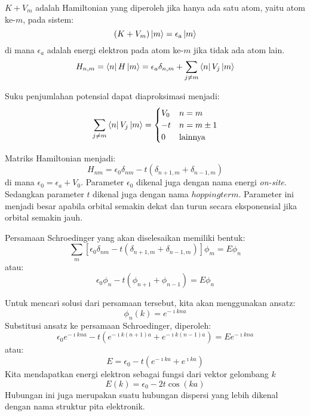 $K + V_{m}$ adalah Hamiltonian yang diperoleh jika hanya ada satu
atom, yaitu atom ke-$m$, pada sistem:
\begin{equation*}
(K + V_{m})\ket{m} = \epsilon_{\mathrm{a}}\ket{m}    
\end{equation*}
di mana $\epsilon_{a}$ adalah energi elektron pada atom ke-$m$
jika tidak ada atom lain.
\begin{equation*}
H_{n,m} = \bra{n}H\ket{m} = \epsilon_{a}\delta_{n,m} + \sum_{j \neq m} \bra{n}V_{j}\ket{m}
\end{equation*}

Suku penjumlahan potensial dapat diaproksimasi menjadi:
\begin{equation*}
\sum_{j \neq m} \bra{n}V_{j}\ket{m} = \begin{cases}
V_{0} & n = m \\
-t & n = m \pm 1 \\
0 & \text{lainnya}
\end{cases}
\end{equation*}

Matriks Hamiltonian menjadi:
\begin{equation*}
H_{nm} = \epsilon_{0}\delta_{nm} - t(\delta_{n+1,m} + \delta_{n-1,m})
\end{equation*}
di mana $\epsilon_{0} = \epsilon_{a} + V_{0}$.
Parameter $\epsilon_{0}$ dikenal juga dengan nama energi \textit{on-site}.
Sedangkan parameter $t$ dikenal juga dengan nama $hopping term$.
Parameter ini menjadi
besar apabila orbital semakin dekat dan turun secara eksponensial jika
orbital semakin jauh.

Persamaan Schroedinger yang akan diselesaikan memiliki bentuk:
\begin{equation*}
\sum_{m} \left[
  \epsilon_{0}\delta_{nm} - t(\delta_{n+1,m} + \delta_{n-1,m})
\right] \phi_{m} =
E \phi_{n}
\end{equation*}
atau:
\begin{equation*}
\epsilon_{0} \phi_{n} - t \left( \phi_{n+1} + \phi_{n-1} \right) =
E \phi_{n}
\end{equation*}

Untuk mencari solusi dari persamaan tersebut, kita akan menggunakan ansatz:
\begin{equation*}
\phi_{n}(k) = e^{-\imath k n a}
\end{equation*}
Substitusi ansatz ke persamaan Schroedinger, diperoleh:
\begin{equation*}
\epsilon_{0} e^{-\imath k n a} - t\left(
e^{-\imath k (n+1) a} + e^{-\imath k (n-1) a}
\right) = E e^{-\imath k n a}
\end{equation*}
atau:
\begin{equation*}
E = \epsilon_{0} - t\left(
e^{-\imath k a} + e^{\imath k a} \right)
\end{equation*}
Kita mendapatkan energi elektron sebagai fungsi dari vektor gelombang $k$
\begin{equation*}
E(k) = \epsilon_{0} - 2t\cos(ka)
\end{equation*}
Hubungan ini juga merupakan suatu hubungan dispersi yang lebih dikenal
dengan nama struktur pita elektronik.

